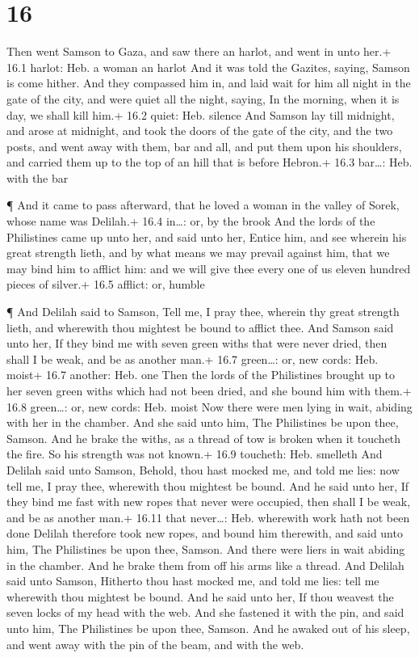 \hypertarget{section-15}{%
\section{16}\label{section-15}}

 Then went Samson to Gaza, and saw there an harlot, and went
in unto her.+ 16.1 harlot: Heb. a woman an harlot  And it
was told the Gazites, saying, Samson is come hither. And they compassed
him in, and laid wait for him all night in the gate of the city, and
were quiet all the night, saying, In the morning, when it is day, we
shall kill him.+ 16.2 quiet: Heb. silence  And Samson lay
till midnight, and arose at midnight, and took the doors of the gate of
the city, and the two posts, and went away with them, bar and all, and
put them upon his shoulders, and carried them up to the top of an hill
that is before Hebron.+ 16.3 bar\ldots: Heb. with the bar

 ¶ And it came to pass afterward, that he loved a woman in
the valley of Sorek, whose name was Delilah.+ 16.4 in\ldots: or, by the
brook  And the lords of the Philistines came up unto her,
and said unto her, Entice him, and see wherein his great strength lieth,
and by what means we may prevail against him, that we may bind him to
afflict him: and we will give thee every one of us eleven hundred pieces
of silver.+ 16.5 afflict: or, humble

 ¶ And Delilah said to Samson, Tell me, I pray thee, wherein
thy great strength lieth, and wherewith thou mightest be bound to
afflict thee.  And Samson said unto her, If they bind me
with seven green withs that were never dried, then shall I be weak, and
be as another man.+ 16.7 green\ldots: or, new cords: Heb. moist+ 16.7
another: Heb. one  Then the lords of the Philistines brought
up to her seven green withs which had not been dried, and she bound him
with them.+ 16.8 green\ldots: or, new cords: Heb. moist  Now
there were men lying in wait, abiding with her in the chamber. And she
said unto him, The Philistines be upon thee, Samson. And he brake the
withs, as a thread of tow is broken when it toucheth the fire. So his
strength was not known.+ 16.9 toucheth: Heb. smelleth  And
Delilah said unto Samson, Behold, thou hast mocked me, and told me lies:
now tell me, I pray thee, wherewith thou mightest be bound.
 And he said unto her, If they bind me fast with new ropes
that never were occupied, then shall I be weak, and be as another man.+
16.11 that never\ldots: Heb. wherewith work hath not been done
 Delilah therefore took new ropes, and bound him therewith,
and said unto him, The Philistines be upon thee, Samson. And there were
liers in wait abiding in the chamber. And he brake them from off his
arms like a thread.  And Delilah said unto Samson, Hitherto
thou hast mocked me, and told me lies: tell me wherewith thou mightest
be bound. And he said unto her, If thou weavest the seven locks of my
head with the web.  And she fastened it with the pin, and
said unto him, The Philistines be upon thee, Samson. And he awaked out
of his sleep, and went away with the pin of the beam, and with the web.

